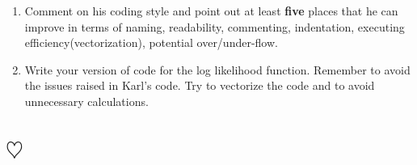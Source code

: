 \documentclass[a4paper]{article}
\begin{document}
\begin{enumerate}
\item Comment on his coding style and point out at least \textbf{five} places
  that he can improve in terms of naming, readability, commenting, indentation,
  executing efficiency(vectorization), potential over/under-flow.

\item Write your version of code for the log likelihood function. Remember to
  avoid the issues raised in Karl's code. Try to vectorize the code and to avoid unnecessary calculations.

\end{enumerate}

\section{$\heartsuit$}
\end{document}
